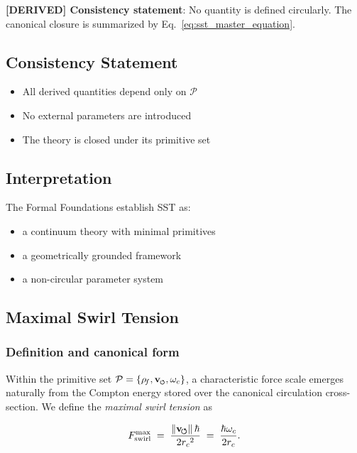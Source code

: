 \documentclass[11pt]{article}
\theoremstyle{definition}
\theoremstyle{plain}
\theoremstyle{remark}
\newcommand{\swirlarrow}{\mathchoice{\mkern-2mu\scriptstyle\boldsymbol{\circlearrowleft}}{\mkern-2mu\scriptstyle\boldsymbol{\circlearrowleft}}{\mkern-2mu\scriptscriptstyle\boldsymbol{\circlearrowleft}}{\mkern-2mu\scriptscriptstyle\boldsymbol{\circlearrowleft}}}
\newcommand{\vswirl}{\mathbf{v}_{\swirlarrow}}
\newcommand{\rhoF}{{\rho_{\!f}}}
\newcommand{\rc}{{r_c}}
\newcommand{\vnorm}{\lVert \mathbf{v}_{\!\boldsymbol{\circlearrowleft}} \rVert}
\begin{document}
        \textbf{[DERIVED] Consistency statement}:
        No quantity is defined circularly. The canonical closure is summarized by Eq.~\ref{eq:sst_master_equation}.
    
    \subsection{Consistency Statement}
        
        \begin{itemize}
            \item All derived quantities depend only on $\mathcal{P}$
            \item No external parameters are introduced
            \item The theory is closed under its primitive set
        \end{itemize}
    
    \subsection{Interpretation}
        
        The Formal Foundations establish SST as:
        
        \begin{itemize}
            \item a continuum theory with minimal primitives
            \item a geometrically grounded framework
            \item a non-circular parameter system
        \end{itemize}

    \subsection{Maximal Swirl Tension}
    \label{sec:Fmax}

        \subsubsection{Definition and canonical form}

        Within the primitive set $\mathcal{P} = \{\rhoF, \vswirl, \omega_c\}$, a characteristic force scale emerges naturally from the Compton energy stored over the canonical circulation cross-section. We define the \emph{maximal swirl tension} as

        \begin{align}
            F_{\rm swirl}^{\max}
            \;=\; \frac{\vnorm\,\hbar}{2\rc^2}
            \;=\; \frac{\hbar\omega_c}{2\rc}.
            \label{eq:Fmax_def}
        \end{align}
\end{document}
